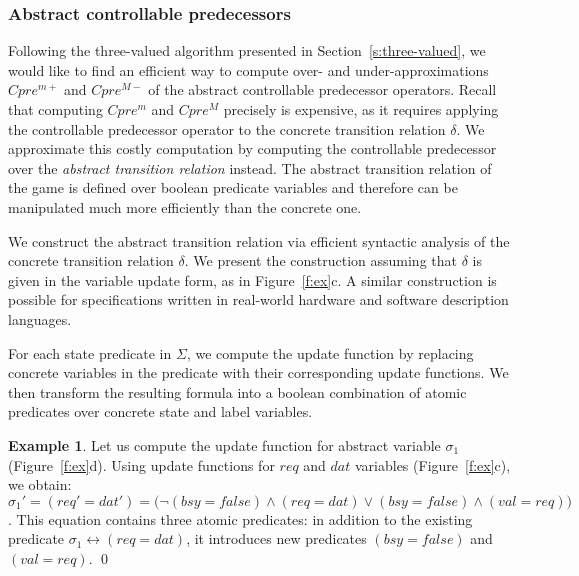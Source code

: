 \documentclass[a4paper,twoside,openright,11pt]{book}
\theoremstyle{definition}
\newtheorem*{ex}{Example}
\begin{document}
\subsubsection{Abstract controllable predecessors}\label{s:cpre}

Following the three-valued algorithm presented in Section~\ref{s:three-valued}, we would like to find an efficient way to compute over- and under-approximations $Cpre^{m+}$ and $Cpre^{M-}$ of the abstract controllable predecessor operators. Recall that computing $Cpre^m$ and $Cpre^M$ precisely is expensive, as it requires applying the controllable predecessor operator to the concrete transition relation $\delta$. We approximate this costly computation by computing the controllable predecessor over the \emph{abstract transition relation} instead. The abstract transition relation of the game is defined over boolean predicate variables and therefore can be manipulated much more efficiently than the concrete one.

We construct the abstract transition relation via efficient syntactic analysis of the concrete transition relation $\delta$. We present the construction assuming that $\delta$ is given in the variable update form, as in Figure~\ref{f:ex}c. A similar construction is possible for specifications written in real-world hardware and software description languages.

For each state predicate in $\Sigma$, we compute the update function by replacing concrete variables in the predicate with their corresponding update functions. We then transform the resulting formula into a boolean combination of atomic predicates over concrete state and label variables.

\begin{ex}
    \everymath{\mathtt{\xdef\tmp{\fam\the\fam\relax}\aftergroup\tmp}}
    \everydisplay{\mathtt{\xdef\tmp{\fam\the\fam\relax}\aftergroup\tmp}}
    Let us compute the update function for abstract variable $\sigma_1$ (Figure~\ref{f:ex}d).  Using update functions for $req$ and $dat$ variables (Figure~\ref{f:ex}c), we obtain: $\sigma_1' = (req' = dat') = \big(\neg(bsy = false) \land (req=dat) \lor (bsy=false) \land (val=req)\big)$. This equation contains three atomic predicates: in addition to the existing predicate $\sigma_1 \leftrightarrow (req=dat)$, it introduces new predicates $(bsy=false)$ and $(val=req)$.  
    \qed
\end{ex}
\end{document}
